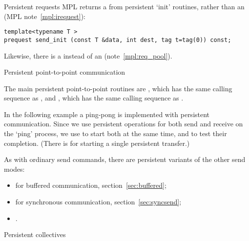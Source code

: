 \begin{mplnote}{Persistent requests}
  MPL returns a 
  from persistent `init' routines, rather than an 
  (MPL note~\ref{mpl:irequest}):
\begin{lstlisting}
template<typename T >
prequest send_init (const T &data, int dest, tag t=tag(0)) const;
\end{lstlisting}
Likewise, there is a 
instead of an  (note~\ref{mpl:req_pool}).
\end{mplnote}

 {Persistent point-to-point communication}
\label{sec:persist-p2p}

The main persistent point-to-point routines are
, which has the same calling sequence as
, and , which has the same
calling sequence as .
  
In the following example a ping-pong is implemented with persistent communication.
Since we use persistent operations for both send and receive on the `ping' process,
we use  to start both at the same time,
and  to test their completion.
(There is  for starting a single persistent transfer.)
%  
%

As with ordinary send commands, there are persistent variants
of the other send modes:
\begin{itemize}
\item
   for buffered communication,
  section~\ref{sec:buffered};
\item
   for synchronous communication,
  section~\ref{sec:syncsend};
\item
  .
\end{itemize}


 {Persistent collectives}

